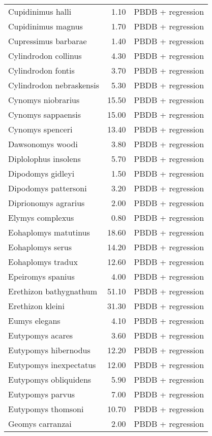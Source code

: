 \begin{table}[ht]
\begin{tabular}{lrl}
  Cupidinimus halli & 1.10 & PBDB + regression \\ 
  Cupidinimus magnus & 1.70 & PBDB + regression \\ 
  Cupressimus barbarae & 1.40 & PBDB + regression \\ 
  Cylindrodon collinus & 4.30 & PBDB + regression \\ 
  Cylindrodon fontis & 3.70 & PBDB + regression \\ 
  Cylindrodon nebraskensis & 5.30 & PBDB + regression \\ 
  Cynomys niobrarius & 15.50 & PBDB + regression \\ 
  Cynomys sappaensis & 15.00 & PBDB + regression \\ 
  Cynomys spenceri & 13.40 & PBDB + regression \\ 
  Dawsonomys woodi & 3.80 & PBDB + regression \\ 
  Diplolophus insolens & 5.70 & PBDB + regression \\ 
  Dipodomys gidleyi & 1.50 & PBDB + regression \\ 
  Dipodomys pattersoni & 3.20 & PBDB + regression \\ 
  Diprionomys agrarius & 2.00 & PBDB + regression \\ 
  Elymys complexus & 0.80 & PBDB + regression \\ 
  Eohaplomys matutinus & 18.60 & PBDB + regression \\ 
  Eohaplomys serus & 14.20 & PBDB + regression \\ 
  Eohaplomys tradux & 12.60 & PBDB + regression \\ 
  Epeiromys spanius & 4.00 & PBDB + regression \\ 
  Erethizon bathygnathum & 51.10 & PBDB + regression \\ 
  Erethizon kleini & 31.30 & PBDB + regression \\ 
  Eumys elegans & 4.10 & PBDB + regression \\ 
  Eutypomys acares & 3.60 & PBDB + regression \\ 
  Eutypomys hibernodus & 12.20 & PBDB + regression \\ 
  Eutypomys inexpectatus & 12.00 & PBDB + regression \\ 
  Eutypomys obliquidens & 5.90 & PBDB + regression \\ 
  Eutypomys parvus & 7.00 & PBDB + regression \\ 
  Eutypomys thomsoni & 10.70 & PBDB + regression \\ 
  Geomys carranzai & 2.00 & PBDB + regression \\ 

\end{tabular}
\end{table}
